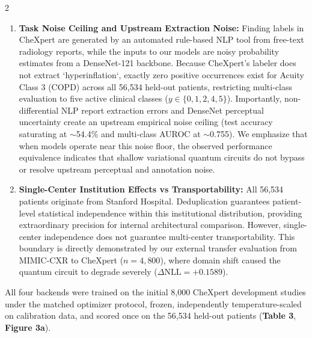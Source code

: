 \documentclass[10pt,a4paper,twoside]{article}
\begin{document}
\begin{multicols}{2}
\begin{enumerate}
  \item \textbf{Task Noise Ceiling and Upstream Extraction Noise:} Finding labels in CheXpert are generated by an automated rule-based NLP tool \cite{irvin2019} from free-text radiology reports, while the inputs to our models are noisy probability estimates from a DenseNet-121 backbone. Because CheXpert's labeler does not extract `hyperinflation`, exactly zero positive occurrences exist for Acuity Class 3 (COPD) across all 56,534 held-out patients, restricting multi-class evaluation to five active clinical classes ($y \in \{0, 1, 2, 4, 5\}$). Importantly, non-differential NLP report extraction errors and DenseNet perceptual uncertainty create an upstream empirical noise ceiling (test accuracy saturating at $\sim$54.4\% and multi-class AUROC at $\sim$0.755). We emphasize that when models operate near this noise floor, the observed performance equivalence indicates that shallow variational quantum circuits do not bypass or resolve upstream perceptual and annotation noise.
  \item \textbf{Single-Center Institution Effects vs Transportability:} All 56,534 patients originate from Stanford Hospital. Deduplication guarantees patient-level statistical independence within this institutional distribution, providing extraordinary precision for internal architectural comparison. However, single-center independence does not guarantee multi-center transportability. This boundary is directly demonstrated by our external transfer evaluation from MIMIC-CXR to CheXpert ($n = 4,800$), where domain shift caused the quantum circuit to degrade severely ($\Delta\text{NLL} = +0.1589$).
\end{enumerate}

All four backends were trained on the initial 8,000 CheXpert development studies under the matched optimizer protocol, frozen, independently temperature-scaled on calibration data, and scored once on the 56,534 held-out patients (\textbf{Table 3}, \textbf{Figure 3a}).

\end{multicols}
\end{document}
